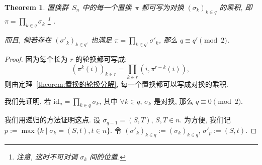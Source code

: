\documentclass[openany]{ctexbook}
\theoremstyle{plain}
\newtheorem{theorem}{Theorem}[section] %
\theoremstyle{definition}
\newcommand*{\id}{\mathrm{id}} %
\begin{document}
\begin{theorem}\label{theorem:置换的对换分解}
	置换群~$S_n$ 中的每一个置换~$\pi$ 都可写为对换 $(\sigma_k)_{k \in q}$ 的乘积, 即
	$\pi = \prod_{k \in q} \sigma_k$%
		\footnote{注意, 这时不可对调 $\sigma_k$ 间的位置. }%
		.
	
	而且, 倘若存在 $(\sigma'_k)_{k \in q'}$ 也满足 $\pi = \prod_{k \in q'} \sigma'_k$, 那么 $q \equiv q' \pmod 2$.
\end{theorem}
\begin{proof}
	因为每个长为 $r$ 的轮换都可写成:
	\begin{equation*}
		(\pi^k(i))_{k \in r} = \prod_{k \in r} (i, \pi^{r - k}(i)),\,
	\end{equation*}
	则由定理~\ref{theorem:置换的轮换分解}, 每一个置换都可以写成对换的乘积.

	我们先证明, 若 $\id_n = \prod_{k \in q} \sigma_k$, 其中 $\forall k \in q$, $\sigma_k$ 是对换, 那么 $q \equiv 0 \pmod 2$.

	我们用递归的方法证明这点. 
	设 $\sigma_{q - 1} = (S, T)$, $S, T \in n$. 
	为方便, 我们记 $p := \max\{ k \mid \sigma_k = (S,t), t\in n\}$.
	令 $(\sigma'_k)_{k \in q} := (\sigma_k)_{k \in q}$, $\sigma'_p := (S, t)$.


\end{proof}
\end{document}
